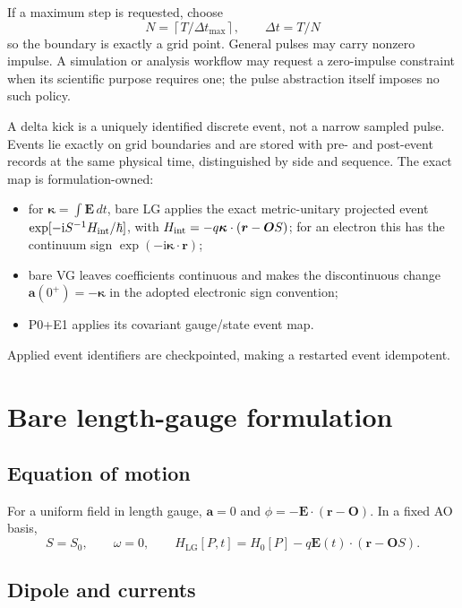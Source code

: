 \documentclass[11pt]{article}
\newcommand{\ii}{\mathrm{i}}
\newcommand{\vect}[1]{\bm{#1}}
\begin{document}
If a maximum step is requested, choose
\begin{equation}
 N=\left\lceil T/\Delta t_{\max}\right\rceil,\qquad
 \Delta t=T/N
\end{equation}
so the boundary is exactly a grid point. General pulses may carry nonzero
impulse. A simulation or analysis workflow may request a zero-impulse
constraint when its scientific purpose requires one; the pulse abstraction
itself imposes no such policy.

A delta kick is a uniquely identified discrete event, not a narrow sampled
pulse. Events lie exactly on grid boundaries and are stored with pre- and
post-event records at the same physical time, distinguished by side and
sequence. The exact map is formulation-owned:

\begin{itemize}
\item for \(\vect\kappa=\int\vect E\,dt\), bare LG applies the exact
  metric-unitary projected event
  \(\exp[-\ii S^{-1}H_{\rm int}/\hbar]\), with
  \(H_{\rm int}=-q\vect\kappa\cdot(\vect r-\vect O S)\); for an electron
  this has the continuum sign \(\exp(-\ii\vect\kappa\cdot\vect r)\);
\item bare VG leaves coefficients continuous and makes the discontinuous
  change \(\vect a(0^+)=-\vect\kappa\) in the adopted electronic sign
  convention;
\item P0+E1 applies its covariant gauge/state event map.
\end{itemize}

Applied event identifiers are checkpointed, making a restarted event
idempotent.

\section{Bare length-gauge formulation}

\subsection{Equation of motion}

For a uniform field in length gauge, \(\vect a=0\) and
\(\phi=-\vect E\cdot(\vect r-\vect O)\). In a fixed AO basis,
\begin{equation}
 S=S_0,\qquad \omega=0,\qquad
 H_{\mathrm{LG}}[P,t]
 =H_0[P]-q\vect E(t)\cdot(\vect r-\vect O S).
 \label{eq:lg-hamiltonian}
\end{equation}

\subsection{Dipole and currents}
\end{document}
